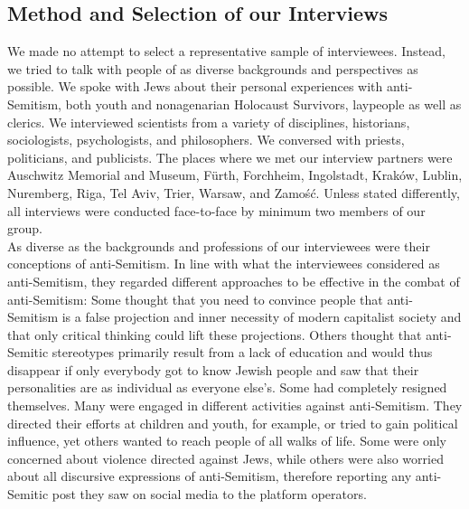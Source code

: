 \subsection*{Method and Selection of our Interviews}
We made no attempt to select a representative sample of interviewees. Instead, we tried to talk with people of as diverse backgrounds and perspectives as possible. We spoke with Jews about their personal experiences with anti-Semitism, both youth and nonagenarian Holocaust Survivors, laypeople as well as clerics. We interviewed scientists from a variety of disciplines, historians, sociologists, psychologists, and philosophers. We conversed with priests, politicians, and publicists. The places where we met our interview partners were Auschwitz Memorial and Museum, Fürth, Forchheim, Ingolstadt, Kraków, Lublin, Nuremberg, Riga, Tel Aviv, Trier, Warsaw, and Zamość. Unless stated differently, all interviews were conducted face-to-face by minimum two members of our group. \\
As diverse as the backgrounds and professions of our interviewees were their conceptions of anti-Semitism. In line with what the interviewees considered as anti-Semitism, they regarded different approaches to be effective in the combat of anti-Semitism: Some thought that you need to convince people that anti-Semitism is a false projection and inner necessity of modern capitalist society and that only critical thinking could lift these projections. Others thought that anti-Semitic stereotypes primarily result from a lack of education and would thus disappear if only everybody got to know Jewish people and saw that their personalities are as individual as everyone else's. Some had completely resigned themselves. Many were engaged in different activities against anti-Semitism. They directed their efforts at children and youth, for example, or tried to gain political influence, yet others wanted to reach people of all walks of life. Some were only concerned about violence directed against Jews, while others were also worried about all discursive expressions of anti-Semitism, therefore reporting any anti-Semitic post they saw on social media to the platform operators. 
